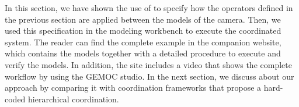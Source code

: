 In this section, we have shown the use of \bflow to specify how the operators defined in the previous section are applied between the models of the camera. Then, we used this specification in the modeling workbench to execute the coordinated system. The reader can find the complete example in the companion website, which contains the models together with a detailed procedure to execute and verify the models. In addition, the site includes a video that shows the complete workflow by using the GEMOC studio. In the next section, we discuss about our approach by comparing it with coordination frameworks that propose a hard-coded hierarchical coordination.  

	
	
	